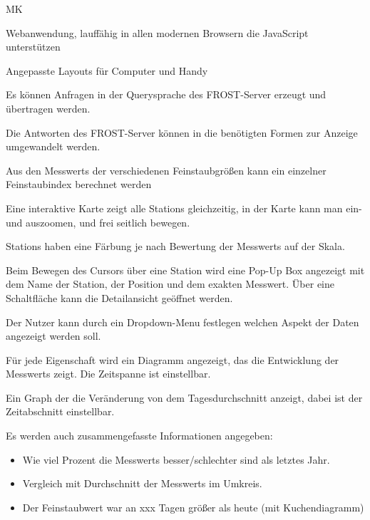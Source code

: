 \begin{Kriterien}{MK}

	\item \gls{Webanwendung}, lauffähig in allen modernen Browsern die JavaScript unterstützen

	\item Angepasste Layouts für Computer und \gls{Handy}
	
	\item Es können Anfragen in der \gls{Querysprache} des \gls{FROST-Server} erzeugt und übertragen werden.
	
	\item Die Antworten des \gls{FROST-Server} können in die benötigten Formen zur Anzeige umgewandelt werden.
	
	\item Aus den \glspl{Messwert} der verschiedenen Feinstaubgrößen kann ein einzelner \gls{Feinstaubindex} berechnet werden

	\item Eine interaktive Karte zeigt alle \glspl{Station} gleichzeitig, in der Karte kann man ein- und auszoomen, und frei seitlich bewegen.

	\item \glspl{Station} haben eine Färbung je nach Bewertung der \glspl{Messwert} auf der Skala.
	
	\item Beim Bewegen des Cursors über eine \gls{Station} wird eine \gls{Pop-Up} Box angezeigt mit dem Name der Station, der Position und dem exakten Messwert.
		Über eine Schaltfläche kann die Detailansicht geöffnet werden.
	
	\item Der Nutzer kann durch ein \gls{Dropdown-Menu} festlegen welchen Aspekt der Daten angezeigt werden soll. 
	
	\item Für jede Eigenschaft wird ein Diagramm angezeigt, das die Entwicklung der \glspl{Messwert} zeigt. Die Zeitspanne ist einstellbar.
	
	\item Ein \gls{Graph} der die Veränderung von dem Tagesdurchschnitt anzeigt, dabei ist der Zeitabschnitt einstellbar.
	
	\item Es werden auch zusammengefasste Informationen angegeben: 
\end{Kriterien}
		
\begin{itemize}
	\item Wie viel Prozent die \glspl{Messwert} besser/schlechter sind als letztes Jahr.
    \item Vergleich mit Durchschnitt der \glspl{Messwert} im Umkreis.
    \item Der Feinstaubwert war an xxx Tagen größer als heute (mit \gls{Kuchendiagramm})
\end{itemize}

